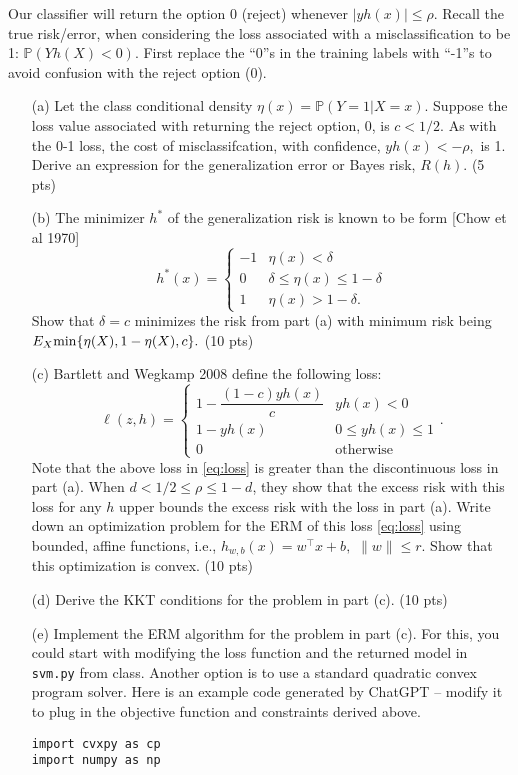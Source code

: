 \documentclass[12pt]{article}
\begin{document}
Our classifier will return the option 0 (reject) whenever $|yh(x)| \leq \rho.$ Recall the true risk/error, when considering the loss associated with a misclassification to be 1: $\mathbb{P}(Y h(X) < 0)$.  First replace the ``0''s in the training labels with ``-1''s to avoid confusion with the reject option (0).

\begin{itemize}
	\item[(a)] Let the class conditional density $\eta(x) = \mathbb{P}(Y = 1|X = x).$ Suppose the loss value associated with returning the reject option, 0, is $c < 1/2.$ As with the 0-1 loss, the cost of misclassifcation, with confidence, $y h(x) < -\rho,$ is 1. Derive an expression for the generalization error or Bayes risk, $R(h)$. (5 pts)

	\item[(b)] The minimizer $h^*$ of the generalization risk is known to be form [Chow et al 1970]
	\begin{equation}
		h^*(x) = \begin{cases}
			-1 & \eta(x) < \delta \\
			0 & 	\delta \leq \eta(x) \leq 1-\delta \\
			1 & \eta(x) > 1 -\delta.
		\end{cases}
	\end{equation}
	Show that $\delta = c$ minimizes the risk from part (a) with minimum risk being $E_X {\rm min}\{\eta(X), 1- \eta(X), c\}.$ (10 pts)
\item[(c)] Bartlett and Wegkamp 2008 define the following loss:
	\begin{equation}
		\label{eq:loss}
		\ell(z, h) = \begin{cases}
			1 - \dfrac{(1-c)yh(x)}{c} & yh(x) < 0 \\
			1 - yh(x) & 0\leq yh(x) \leq 1 \\
			0 & \text{otherwise}
		\end{cases}.
	\end{equation}
Note that the above loss in \eqref{eq:loss} is greater than the discontinuous loss in part (a). When $d < 1/2 \leq \rho \leq 1-d$, they show that the excess risk with this loss for any $h$ upper bounds the excess risk with the loss in part (a). Write down an optimization problem for the ERM of this loss \eqref{eq:loss} using bounded, affine functions, i.e., $h_{w,b}(x) = w^\top x + b,$ $\|w\| \leq r.$ Show that this optimization is convex. (10 pts)
\item[(d)] Derive the KKT conditions for the problem in part (c). (10 pts)
\item[(e)] Implement the ERM algorithm for the problem in part (c). For this, you could start with modifying the loss function and the returned model in \verb+svm.py+ from class. Another option is to use a standard quadratic convex program solver. Here is an example code generated by ChatGPT -- modify it to plug in the objective function and constraints derived above.
\begin{lstlisting}
import cvxpy as cp
import numpy as np


\end{lstlisting}
\end{itemize}
\end{document}
